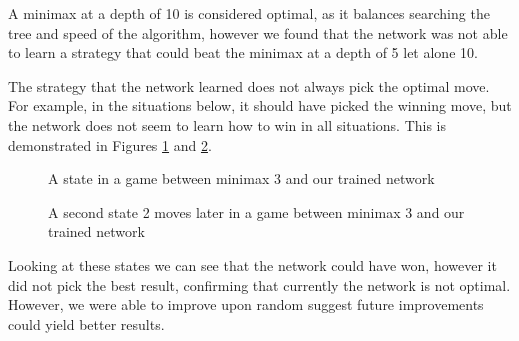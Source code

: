 A minimax at a depth of 10 is considered optimal, as it balances searching the tree and speed of the algorithm, however we found that the network was not able to learn a strategy that could beat the minimax at a depth of 5 let alone 10.

The strategy that the network learned does not always pick the optimal move. For example, in the situations below, it should have picked the winning move, but the network does not seem to learn how to win in all situations. This is demonstrated in Figures \ref{state_move_0} and  \ref{state_move_2}.

\begin{figure}[b]
    \caption{A state in a game between minimax 3 and our trained network}
    \label{state_move_0}
\end{figure}


\begin{figure}[b]
    \caption{A second state 2 moves later in a game between minimax 3 and our trained network}
    \label{state_move_2}
\end{figure}


Looking at these states we can see that the network could have won, however it did not pick the best result, confirming that currently the network is not optimal. However, we were able to improve upon random suggest future improvements could yield better results. 